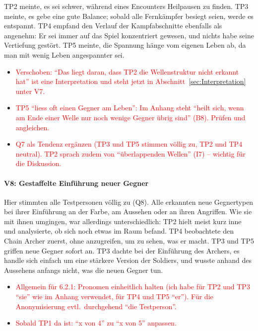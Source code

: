 \documentclass[../Main.tex]{subfiles}
\begin{document}
TP2 meinte, es sei schwer, während eines Encounters Heilpausen zu finden. TP3 meinte, es gebe eine gute Balance; sobald alle Fernkämpfer besiegt seien, werde es entspannt. TP4 empfand den Verlauf der Kampfabschnitte ebenfalls als angenehm: Er sei immer auf das Spiel konzentriert gewesen, und nichts habe seine Vertiefung gestört. TP5 meinte, die Spannung hänge vom eigenen Leben ab, da man mit wenig Leben angespannter sei.

\begin{itemize}[leftmargin=1.5cm]
    \item \textcolor{red}{Verschoben: \enquote{Das liegt daran, dass TP2 die Wellenstruktur nicht erkannt hat} ist eine Interpretation und steht jetzt in Abschnitt~\ref{sec:Interpretation} unter V7.}
    \item \textcolor{red}{TP5 \enquote{liess oft einen Gegner am Leben}: Im Anhang steht \enquote{heilt sich, wenn am Ende einer Welle nur noch wenige Gegner übrig sind} (B8). Prüfen und angleichen.}
    \item \textcolor{red}{Q7 als Tendenz ergänzen (TP3 und TP5 stimmen völlig zu, TP2 und TP4 neutral). TP2 sprach zudem von \enquote{überlappenden Wellen} (I7) -- wichtig für die Diskussion.}
\end{itemize}

\paragraph{V8: Gestaffelte Einführung neuer Gegner}
Hier stimmten alle Testpersonen völlig zu (Q8). Alle erkannten neue Gegnertypen bei ihrer Einführung an der Farbe, am Aussehen oder an ihren Angriffen. Wie sie mit ihnen umgingen, war allerdings unterschiedlich: TP2 hielt meist kurz inne und analysierte, ob sich noch etwas im Raum befand. TP4 beobachtete den Chain Archer zuerst, ohne anzugreifen, um zu sehen, was er macht. TP3 und TP5 griffen neue Gegner sofort an. TP3 dachte bei der Einführung des Archers, es handle sich einfach um eine stärkere Version der Soldiers, und wusste anhand des Aussehens anfangs nicht, was die neuen Gegner tun.

\begin{itemize}[leftmargin=1.5cm]
    \item \textcolor{red}{Allgemein für 6.2.1: Pronomen einheitlich halten (ich habe für TP2 und TP3 \enquote{sie} wie im Anhang verwendet, für TP4 und TP5 \enquote{er}). Für die Anonymisierung evtl.\ durchgehend \enquote{die Testperson}.}
    \item \textcolor{red}{Sobald TP1 da ist: \enquote{x von 4} zu \enquote{x von 5} anpassen.}
\end{itemize}
\end{document}
